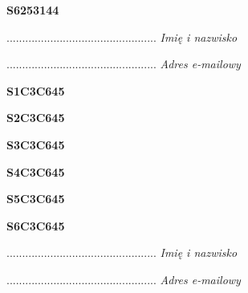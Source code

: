 \begin{turn}{90}\huge \textbf{S6253144}\end{turn}

\begin{turn}{90}\begin{minipage}{\linewidth} \vspace{20mm} ................................................  \textit{Imię i nazwisko}\end{minipage}\end{turn}

\begin{turn}{90}\begin{minipage}{\linewidth} \vspace{20mm} ................................................  \textit{Adres e-mailowy}\end{minipage}\end{turn}

\begin{turn}{90}\huge \textbf{S1C3C645}\end{turn}

\begin{turn}{90}\huge \textbf{S2C3C645}\end{turn}

\begin{turn}{90}\huge \textbf{S3C3C645}\end{turn}

\begin{turn}{90}\huge \textbf{S4C3C645}\end{turn}

\begin{turn}{90}\huge \textbf{S5C3C645}\end{turn}

\begin{turn}{90}\huge \textbf{S6C3C645}\end{turn}

\begin{turn}{90}\begin{minipage}{\linewidth} \vspace{20mm} ................................................  \textit{Imię i nazwisko}\end{minipage}\end{turn}

\begin{turn}{90}\begin{minipage}{\linewidth} \vspace{20mm} ................................................  \textit{Adres e-mailowy}\end{minipage}\end{turn}

